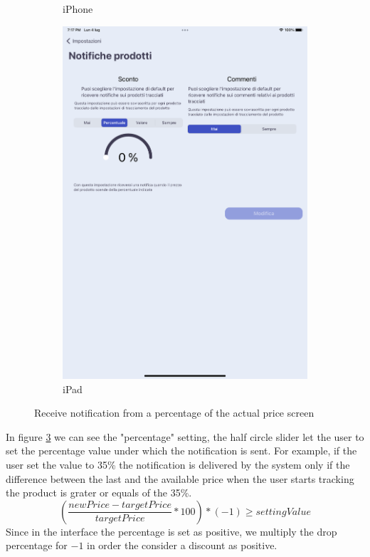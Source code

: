 \begin{figure}[h!]
\begin{subfigure}[b]{0.3\textwidth}
            \caption{iPhone}
            \label{fig:percentage_notification_screen_iphone}
        \end{subfigure}
        \begin{subfigure}[b]{0.45\textwidth}
            \centering
            \includegraphics[width=\textwidth]{images/interfaces/percentage_notification_screen_ipad.png}
            \caption{iPad}
            \label{fig:percentage_notification_screen_ipad}
        \end{subfigure}
         \caption{Receive notification from a percentage of the actual price screen}
        \label{fig:percentage_notification_screen}
\end{figure}
\FloatBarrier
In figure \ref{fig:percentage_notification_screen} we can see the "percentage" setting, the half circle slider let the user to set the percentage value under which the notification is sent. For example, if the user set the value to 35\% the notification is delivered by the system only if the difference between the last and the available price when the user starts tracking the product is grater or equals of the 35\%.
\\
\begin{equation}
    (\frac{newPrice - targetPrice}{targetPrice}*100)*(-1) \geq settingValue
\end{equation}
Since in the interface the percentage is set as positive, we multiply the drop percentage for $-1$ in order the consider a discount as positive.

